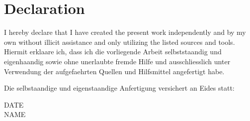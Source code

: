 
\cleardoublepage
\section*{Declaration}
I hereby declare that I have created the present work independently and by my own without illicit assistance and only utilizing the listed sources and tools.\\

Hiermit erklaare ich, dass ich die vorliegende Arbeit selbststaandig und eigenhaandig sowie ohne unerlaubte fremde Hilfe und ausschliesslich unter Verwendung der aufgefaehrten Quellen und Hilfsmittel angefertigt habe.

Die selbstaandige und eigenstaandige Anfertigung versichert an Eides statt:
\begin{center}
DATE\\[3pc]
NAME
\end{center}
